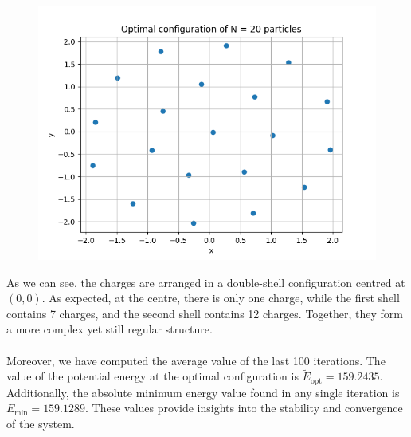 \documentclass{article}
\begin{document}
\begin{figure}[H]
    \centering
    \includegraphics[width=\linewidth]{images/Figure2.N20.png}
    \caption{}
    \label{fig:Figure2.N20.png}
\end{figure}
\noindent As we can see, the charges are arranged in a double-shell configuration centred at $(0,0)$. As expected, at the centre, there is only one charge, while the first shell contains 7 charges, and the second shell contains 12 charges. Together, they form a more complex yet still regular structure.\\\\
Moreover, we have computed the average value of the last 100 iterations. The value of the potential energy at the optimal configuration is $\tilde{E}_{\text{opt}} = 159.2435$. Additionally, the absolute minimum energy value found in any single iteration is $E_{\text{min}} = 159.1289$. These values provide insights into the stability and convergence of the system.

\clearpage
\end{document}
